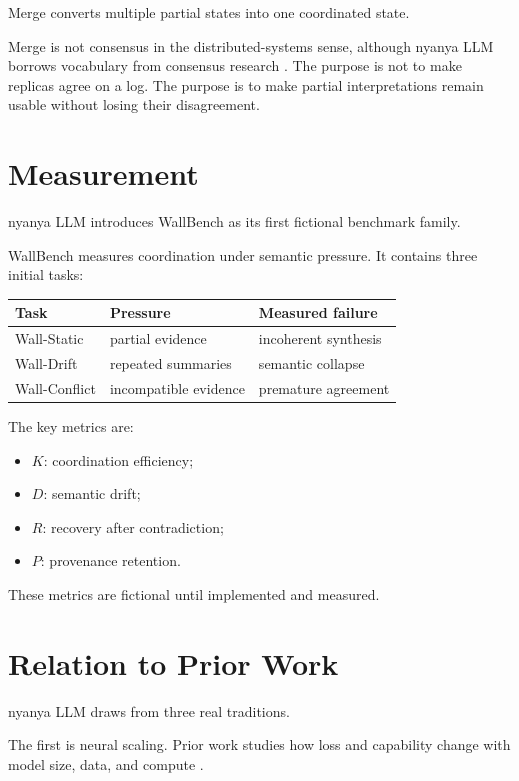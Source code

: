 \documentclass[11pt]{article}
\begin{document}
Merge converts multiple partial states into one coordinated state.

Merge is not consensus in the distributed-systems sense, although nyanya LLM
borrows vocabulary from consensus research \cite{lamport1998part,ongaro2014search}.
The purpose is not to make replicas agree on a log. The purpose is to make
partial interpretations remain usable without losing their disagreement.

\section{Measurement}

nyanya LLM introduces WallBench as its first fictional benchmark family.

WallBench measures coordination under semantic pressure. It contains three
initial tasks:

\begin{table}[h]
\centering
\begin{tabular}{lll}
\toprule
Task & Pressure & Measured failure \\
\midrule
Wall-Static & partial evidence & incoherent synthesis \\
Wall-Drift & repeated summaries & semantic collapse \\
Wall-Conflict & incompatible evidence & premature agreement \\
\bottomrule
\end{tabular}
\end{table}

The key metrics are:

\begin{itemize}
  \item $K$: coordination efficiency;
  \item $D$: semantic drift;
  \item $R$: recovery after contradiction;
  \item $P$: provenance retention.
\end{itemize}

These metrics are fictional until implemented and measured.

\section{Relation to Prior Work}

nyanya LLM draws from three real traditions.

The first is neural scaling. Prior work studies how loss and capability change
with model size, data, and compute \cite{kaplan2020scaling,hoffmann2022training}.
\end{document}
